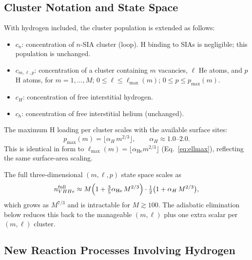 \documentclass[pdflatex,sn-basic]{sn-jnl} %
\begin{document}
\subsection{Cluster Notation and State Space}
\label{sec:H_notation}

With hydrogen included, the cluster population is extended as follows:

\begin{itemize}
  \item $c_{n}$: concentration of $n$-SIA cluster (loop).
        H binding to SIAs is negligible; this population is unchanged.
  \item $c_{m,\ell,p}$: concentration of a cluster containing
        $m$ vacancies, $\ell$ He atoms, and $p$ H atoms,
        for $m = 1, \ldots, M$; $0 \leq \ell \leq \ell_{\max}(m)$;
        $0 \leq p \leq p_{\max}(m)$.
  \item $c_H$: concentration of free interstitial hydrogen.
  \item $c_h$: concentration of free interstitial helium (unchanged).
\end{itemize}

The maximum H loading per cluster scales with the available surface sites:
\begin{equation}\label{eq:pmax}
    p_{\max}(m) = \lfloor \alpha_H\,m^{2/3} \rfloor,
    \qquad \alpha_H \approx 1.0\text{--}2.0.
\end{equation}
This is identical in form to $\ell_{\max}(m) = \lfloor \alpha_{\mathrm{He}}
m^{2/3} \rfloor$ (Eq.~\ref{eq:ellmax}), reflecting the same surface-area
scaling.

The full three-dimensional $(m,\ell,p)$ state space scales as
\begin{equation}
    n_{VHHe}^{\mathrm{full}}
    \approx M\Bigl(1 + \tfrac{3}{5}\alpha_{\mathrm{He}}\,M^{2/3}\Bigr)
             \cdot \tfrac{1}{2}\bigl(1 + \alpha_H\,M^{2/3}\bigr),
\end{equation}
which grows as $M^{7/3}$ and is intractable for $M \gtrsim 100$.
The adiabatic elimination below reduces this back to the manageable
$(m,\ell)$ plus one extra scalar per $(m,\ell)$ cluster.

\subsection{New Reaction Processes Involving Hydrogen}
\label{sec:H_reactions}
\end{document}
